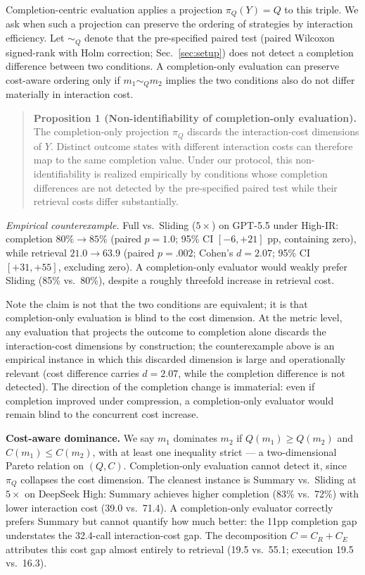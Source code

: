 \documentclass[11pt]{article}
\begin{document}
Completion-centric evaluation applies a projection $\pi_Q(Y) = Q$ to this triple. We ask when
such a projection can preserve the ordering of strategies by interaction efficiency. Let
$\sim_Q$ denote that the pre-specified paired test (paired Wilcoxon signed-rank with Holm
correction; Sec.~\ref{sec:setup}) does not detect a completion difference between two conditions. A
completion-only evaluation can preserve cost-aware ordering only if $m_1 \sim_Q m_2$ implies the
two conditions also do not differ materially in interaction cost.

\begin{quote}
\textbf{Proposition 1 (Non-identifiability of completion-only evaluation).} The completion-only
projection $\pi_Q$ discards the interaction-cost dimensions of $Y$. Distinct outcome states with
different interaction costs can therefore map to the same completion value. Under our
protocol, this non-identifiability is realized empirically by conditions whose completion
differences are not detected by the pre-specified paired test while their retrieval costs
differ substantially.
\end{quote}

\emph{Empirical counterexample.} Full vs.\ Sliding ($5\times$) on GPT-5.5 under High-IR: completion
$80\% \to 85\%$ (paired $p = 1.0$; 95\% CI $[-6, +21]$ pp, containing zero), while retrieval
$21.0 \to 63.9$ (paired $p = .002$; Cohen's $d = 2.07$; 95\% CI $[+31, +55]$, excluding zero). A
completion-only evaluator would weakly prefer Sliding (85\% vs.\ 80\%), despite a roughly
threefold increase in retrieval cost.

Note the claim is not that the two conditions are equivalent; it is that completion-only
evaluation is blind to the cost dimension. At the metric level, any evaluation that
projects the outcome to completion alone discards the interaction-cost dimensions by
construction; the counterexample above is an empirical instance in which this discarded
dimension is large and operationally relevant (cost difference carries $d = 2.07$, while the
completion difference is not detected). The direction of the completion change is
immaterial: even if completion improved under compression, a completion-only evaluator
would remain blind to the concurrent cost increase.

\textbf{Cost-aware dominance.} We say $m_1$ dominates $m_2$ if $Q(m_1) \ge Q(m_2)$ and $C(m_1) \le C(m_2)$, with
at least one inequality strict --- a two-dimensional Pareto relation on $(Q, C)$.
Completion-only evaluation cannot detect it, since $\pi_Q$ collapses the cost dimension. The
cleanest instance is Summary vs.\ Sliding at $5\times$ on DeepSeek High: Summary achieves higher
completion (83\% vs.\ 72\%) with lower interaction cost (39.0 vs.\ 71.4). A completion-only
evaluator correctly prefers Summary but cannot quantify how much better: the 11pp
completion gap understates the 32.4-call interaction-cost gap. The decomposition $C = C_R +
C_E$ attributes this cost gap almost entirely to retrieval (19.5 vs.\ 55.1; execution 19.5
vs.\ 16.3).
\end{document}
